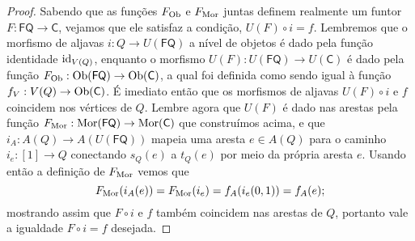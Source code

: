\begin{proof}
    Sabendo que as funções $F_{\mathrm{Ob}}$ e $F_{\mathrm{Mor}}$ juntas definem realmente um funtor $F: \mathsf{FQ} \to \mathsf{C}$, vejamos que ele satisfaz a condição, $U(F) \circ i = f$.
    Lembremos que o morfismo de aljavas $i: Q \to U(\mathsf{FQ})$ a nível de objetos é dado pela função identidade $\mathrm{id}_{V(Q)}$, enquanto o morfismo $U(F): U(\mathsf{FQ}) \to U(\mathsf{C})$ é dado pela função $F_{\mathrm{Ob}}: \mathrm{Ob}(\mathsf{FQ}) \to \mathrm{Ob}(\mathsf{C})$, a qual foi definida como sendo igual à função $f_V: V(Q) \to \mathrm{Ob}(\mathsf{C})$.
    É imediato então que os morfismos de aljavas $U(F) \circ i$ e $f$ coincidem nos vértices de $Q$.
    Lembre agora que $U(F)$ é dado nas arestas pela função $F_{\mathrm{Mor}}: \mathrm{Mor}(\mathsf{FQ}) \to \mathrm{Mor}(\mathsf{C})$ que construímos acima, e que $i_A: A(Q) \to A(U(\mathsf{FQ}))$ mapeia uma aresta $e \in A(Q)$ para o caminho $i_e: [1] \to Q$ conectando $s_Q(e)$ a $t_Q(e)$ por meio da própria aresta $e$.
    Usando então a definição de $F_{\mathrm{Mor}}$ vemos que
    \begin{displaymath}
        F_{\mathrm{Mor}}(i_A(e))
        = F_{\mathrm{Mor}}(i_e)
        = f_A(i_e(0,1))
        = f_A(e);
    \end{displaymath}
    mostrando assim que $F \circ i$ e $f$ também coincidem nas arestas de $Q$, portanto vale a igualdade $F \circ i = f$ desejada.


\end{proof}
